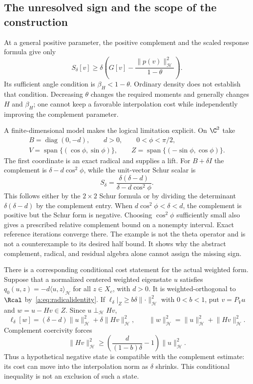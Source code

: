 \documentclass[11pt,a4paper]{article}
\numberwithin{equation}{section}
\theoremstyle{definition}\newtheorem{definition}[theorem]{Definition}
\theoremstyle{remark}\newtheorem{remark}[theorem]{Remark}
\newcommand{\Hh}{\mathcal H}\newcommand{\Hw}{\mathcal H}
\newcommand{\ip}[2]{\langle#1,#2\rangle}\newcommand{\norm}[1]{\lVert#1\rVert}\newcommand{\abs}[1]{\lvert#1\rvert}
\begin{document}
\subsection{The unresolved sign and the scope of the construction}\label{a:sec:scope}

At a general positive parameter, the positive complement and the scaled response formula give only
\begin{equation}\label{a:eq:anglebound}
 S_\delta[v]\ge\delta\left(G[v]
                 -\frac{\norm{p(v)}_{\Hh}^2}{1-\theta}\right).
\end{equation}
Its sufficient angle condition is $\beta_H<1-\theta$. Ordinary density does not establish that condition. Decreasing $\theta$ changes the required moments and generally changes $H$ and $\beta_H$; one cannot keep a favorable interpolation cost while independently improving the complement parameter.

A finite-dimensional model makes the logical limitation explicit. On $\C^2$ take
\[
 \begin{gathered}
 B=\operatorname{diag}(0,-d),\qquad d>0,\qquad0<\phi<\pi/2,\\
 V=\operatorname{span}\{(\cos\phi,\sin\phi)\},\qquad
 Z=\operatorname{span}\{(-\sin\phi,\cos\phi)\}.
 \end{gathered}
\]
The first coordinate is an exact radical and supplies a lift. For $B+\delta I$ the complement is $\delta-d\cos^2\phi$, while the unit-vector Schur scalar is
\begin{equation}\label{a:eq:model}
 S_\delta=\frac{\delta(\delta-d)}{\delta-d\cos^2\phi}.
\end{equation}
This follows either by the $2\times2$ Schur formula or by dividing the determinant $\delta(\delta-d)$ by the complement entry. When
$d\cos^2\phi<\delta<d$, the complement is positive but the Schur form is negative. Choosing $\cos^2\phi$ sufficiently small also gives a prescribed relative complement bound on a nonempty interval. Exact reference iterations converge there. The example is not the theta operator and is not a counterexample to its desired half bound. It shows why the abstract complement, radical, and residual algebra alone cannot assign the missing sign.

There is a corresponding conditional cost statement for the actual weighted form. Suppose that a normalized centered weighted eigenstate $u$ satisfies
$q_0(u,z)=-d\ip uz_{\Hh}$ for all $z\in X_c$, with $d>0$. It is weighted-orthogonal to $\Rcal$ by~\eqref{a:eq:radicalidentity}. If
$\ell_\delta|_Z\ge b\delta\norm{\cdot}_{\Hh}^2$ with $0<b<1$, put
$v=P_Vu$ and $w=u-Hv\in Z$. Since $u\perp_{\Hh} Hv$,
\[
 \ell_\delta[w]=(\delta-d)\norm u_{\Hh}^2
                   +\delta\norm{Hv}_{\Hh}^2,
 \qquad
 \norm w_{\Hh}^2=\norm u_{\Hh}^2+\norm{Hv}_{\Hh}^2.
\]
Complement coercivity forces
\begin{equation}\label{a:eq:conditionalcost}
 \norm{Hv}_{\Hh}^2\ge
 \left(\frac{d}{(1-b)\delta}-1\right)\norm u_{\Hh}^2.
\end{equation}
Thus a hypothetical negative state is compatible with the complement estimate: its cost can move into the interpolation norm as $\delta$ shrinks. This conditional inequality is not an exclusion of such a state.
\end{document}
